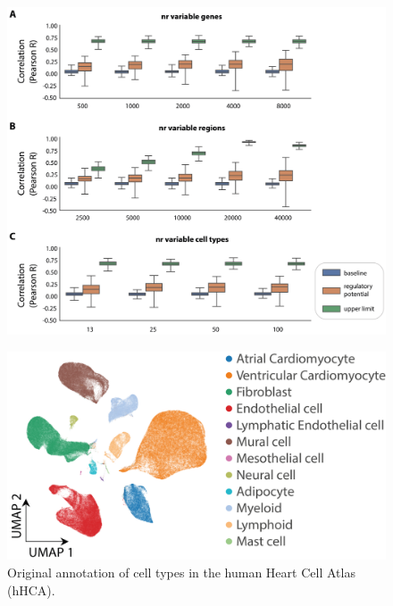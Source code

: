 \begin{figure}
    \centering
    \includegraphics[width=\linewidth]{ch.scepia/imgs/BulkBenchmarks_MvS_Myriad_SuppFig1.png}
    \caption{}
    \label{fig:bulkbenchmark}
\end{figure}

\begin{figure}
    \centering
    \includegraphics[width=\linewidth]{ch.scepia/imgs/SCEPIA_OriginalAnnotation_allCells_SuppFigAnno.png}
    \caption{Original annotation of cell types in the human Heart Cell Atlas (hHCA).}
    \label{fig:scepia_annotation1}
\end{figure}

